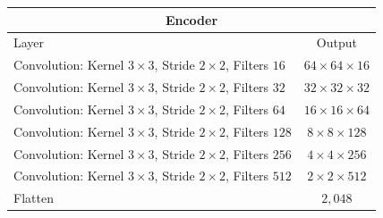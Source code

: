\begin{center}
    \begin{table}[H]
        \centering
        \begin{tabular}{ | l | c | }
            \multicolumn{2}{c}{Encoder} \\ \hline
            Layer & Output\\ \hline
            Convolution: Kernel $3\times3$, Stride $2\times2$, Filters $16 $    & $64\times 64\times 16 $    \\  
            Convolution: Kernel $3\times3$, Stride $2\times2$, Filters $32 $    & $32\times 32\times 32 $    \\
            Convolution: Kernel $3\times3$, Stride $2\times2$, Filters $64 $    & $16\times 16\times 64 $    \\
            Convolution: Kernel $3\times3$, Stride $2\times2$, Filters $128$    & $8\times 8\times   128$    \\
            Convolution: Kernel $3\times3$, Stride $2\times2$, Filters $256$    & $4\times 4\times   256$    \\
            Convolution: Kernel $3\times3$, Stride $2\times2$, Filters $512$    & $2\times 2\times   512$    \\
            Flatten                                                             & $2,048$                    \\
            \hline
        \end{tabular} 
    \end{table}
\end{center}
\vspace{-4em}
